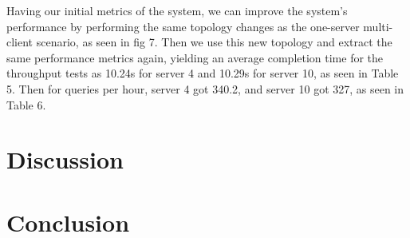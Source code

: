 	Having our initial metrics of the system, we can improve the system's performance by performing the same topology changes as the one-server multi-client scenario, as seen in fig 7. Then we use this new topology and extract the same performance metrics again, yielding an average completion time for the throughput tests as 10.24s for server 4 and 10.29s for server 10, as seen in Table 5. Then for queries per hour, server 4 got 340.2, and server 10 got 327, as seen in Table 6.


\section{Discussion}

\section{Conclusion}

